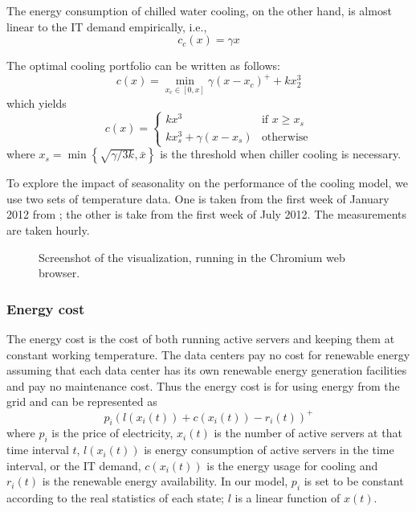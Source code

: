 \documentclass{acm_proc_article-sp}
\begin{document}
The energy consumption of chilled water cooling, on the other hand, is almost linear to the IT demand empirically, i.e.,
\begin{equation}
c_c(x) = \gamma x
\end{equation}

The optimal cooling portfolio can be written as follows:
\begin{equation}
c(x) =  \min_{x_c \in [0,x]} \gamma(x-x_c)^+ + kx_2^3
\end{equation}
which yields
$$
c(x) = \left\{ \begin{array}{ll}
         kx^3 & \mbox{if $x \geq x_s$}\\
        kx_s^3 + \gamma (x-x_s) & \mbox{otherwise}\end{array} \right.
$$
where $x_s = \min \left\{\sqrt{\gamma/3k}, \bar{x}\right\}$ is the threshold when chiller cooling is necessary.

To explore the impact of seasonality on the performance of the cooling model, we use two sets of temperature data. One is taken from the first week of January 2012 from \cite{temp}; the other is take from the first week of July 2012. The measurements are taken hourly.

\begin{figure*}
\centering
{}
\caption{Screenshot of the visualization, running in the Chromium web browser.}
\end{figure*}
\subsubsection{Energy cost}
The energy cost is the cost of both running active servers and keeping them at constant working temperature. The data centers pay no cost for renewable energy assuming that each data center has its own renewable energy generation facilities and pay no maintenance cost. Thus the energy cost is for using energy from the grid and can be represented as
\begin{equation}
p_i(l(x_i(t)) + c(x_i(t)) - r_i(t))^+
\end{equation}  
where $p_i$ is the price of electricity, $x_i(t)$ is the number of active servers at that time interval $t$, $l(x_i(t))$ is energy consumption of active servers in the time interval, or the IT demand, $c(x_i(t))$ is the energy usage for cooling and $r_i(t)$ is the renewable energy availability. In our model, $p_i$ is set to be constant according to the real statistics of each state; $l$ is a linear function of $x(t)$.
\end{document}
